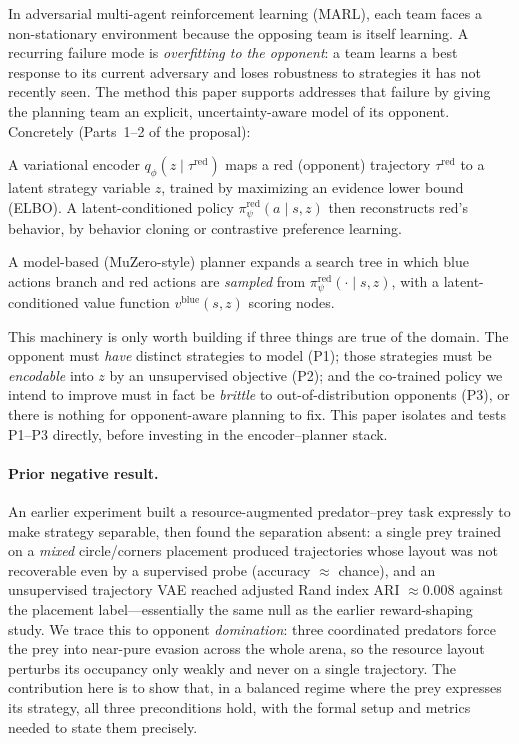 \documentclass[11pt]{article}
\newcommand{\zlat}{z}
\newcommand{\tred}{\tau^{\mathrm{red}}}
\begin{document}
In adversarial multi-agent reinforcement learning (MARL), each team faces a
non-stationary environment because the opposing team is itself learning. A
recurring failure mode is \emph{overfitting to the opponent}: a team learns a
best response to its current adversary and loses robustness to strategies it has
not recently seen. The method this paper supports addresses that failure by
giving the planning team an explicit, uncertainty-aware model of its opponent.
Concretely (Parts~1--2 of the proposal):

\begin{description}[style=nextline,font=\normalfont\bfseries,leftmargin=1.2em]
\item[Part 1 (encoder).] A variational encoder
$q_\phi(\zlat \mid \tred)$ maps a red (opponent) trajectory $\tred$ to a latent
strategy variable $\zlat$, trained by maximizing an evidence lower bound (ELBO).
A latent-conditioned policy $\pi^{\mathrm{red}}_\psi(a \mid s, \zlat)$ then
reconstructs red's behavior, by behavior cloning or contrastive preference
learning.
\item[Part 2 (planner).] A model-based (MuZero-style) planner expands a search
tree in which blue actions branch and red actions are \emph{sampled} from
$\pi^{\mathrm{red}}_\psi(\cdot \mid s, \zlat)$, with a latent-conditioned value
function $v^{\mathrm{blue}}(s, \zlat)$ scoring nodes.
\end{description}

This machinery is only worth building if three things are true of the domain.
The opponent must \emph{have} distinct strategies to model (P1); those strategies
must be \emph{encodable} into $\zlat$ by an unsupervised objective (P2); and the
co-trained policy we intend to improve must in fact be \emph{brittle} to
out-of-distribution opponents (P3), or there is nothing for opponent-aware
planning to fix. This paper isolates and tests P1--P3 directly, before investing
in the encoder--planner stack.

\paragraph{Prior negative result.}
An earlier experiment built a resource-augmented predator--prey task expressly to
make strategy separable, then found the separation absent: a single prey trained
on a \emph{mixed} circle/corners placement produced trajectories whose layout was
not recoverable even by a supervised probe (accuracy $\approx$ chance), and an
unsupervised trajectory VAE reached adjusted Rand index ARI $\approx 0.008$
against the placement label---essentially the same null as the earlier
reward-shaping study. We trace this to opponent \emph{domination}: three
coordinated predators force the prey into near-pure evasion across the whole
arena, so the resource layout perturbs its occupancy only weakly and never on a
single trajectory. The contribution here is to show that, in a balanced regime
where the prey expresses its strategy, all three preconditions hold, with the
formal setup and metrics needed to state them precisely.
\end{document}
